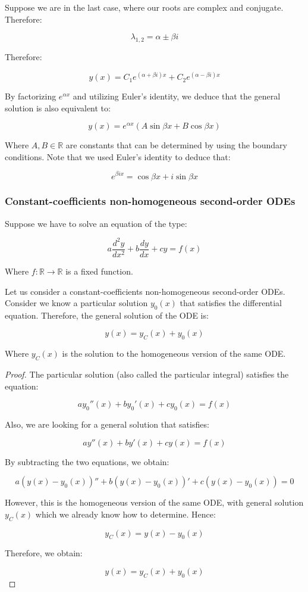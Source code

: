 \documentclass[12pt]{article}
\begin{document}
\begin{proposition}
    Suppose we are in the last case, where our roots are complex and conjugate. Therefore:

    \[ \lambda_{1, 2} = \alpha \pm \beta i \]

    Therefore:

    \[ y(x) = C_1e^{(\alpha + \beta i)x} + C_2e^{(\alpha - \beta i)x} \]

    By factorizing $e^{\alpha x}$ and utilizing Euler's identity, we deduce that the general solution is also equivalent to:

    \[ y(x) = e^{\alpha x}(A\sin{\beta x} + B\cos{\beta x}) \]

    Where $A, B \in \mathbb{R}$ are constants that can be determined by using the boundary conditions. Note that we used Euler's identity to deduce that:

    \[ e^{\beta i x} = \cos{\beta x} + i\sin{\beta x} \]
\end{proposition}

\subsubsection{Constant-coefficients non-homogeneous second-order ODEs}

Suppose we have to solve an equation of the type:

\[ a\frac{d^2y}{dx^2} + b\frac{dy}{dx} + cy = f(x) \]

Where $f : \mathbb{R} \to \mathbb{R}$ is a fixed function.

\begin{theorem}
    Let us consider a constant-coefficients non-homogeneous second-order ODEs. Consider we know a particular solution $y_0(x)$ that satisfies the differential equation. Therefore, the general solution of the ODE is:

    \[ y(x) = y_C(x) + y_0(x) \]

    Where $y_C(x)$ is the solution to the homogeneous version of the same ODE.
\end{theorem}

\begin{proof}
    The particular solution (also called the particular integral) satisfies the equation:

    \[ ay_0''(x) + by_0'(x) + cy_0(x) = f(x) \]

    Also, we are looking for a general solution that satisfies:

    \[ ay''(x) + by'(x) + cy(x) = f(x) \]

    By subtracting the two equations, we obtain:

    \[ a(y(x) - y_0(x))'' + b(y(x) - y_0(x))' + c(y(x) - y_0(x)) = 0 \]

    However, this is the homogeneous version of the same ODE, with general solution $y_C(x)$ which we already know how to determine. Hence:

    \[ y_C(x) = y(x) - y_0(x) \]

    Therefore, we obtain:

    \[ y(x) = y_C(x) + y_0(x) \]
\end{proof}
\end{document}

